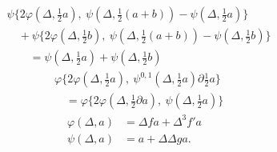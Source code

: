 \[
\begin{aligned}
&\psi\{2\varphi(\Delta,\tfrac12 a),\ \psi(\Delta,\tfrac12(a+b))-\psi(\Delta,\tfrac12 a)\}\\
&\quad+\psi\{2\varphi(\Delta,\tfrac12 b),\ \psi(\Delta,\tfrac12(a+b))-\psi(\Delta,\tfrac12 b)\}\\
&\qquad=\psi(\Delta,\tfrac12 a)+\psi(\Delta,\tfrac12 b)
\end{aligned}
\]
\[
\begin{aligned}
&\varphi\{2\varphi(\Delta,\tfrac12 a),\ \psi^{0,1}(\Delta,\tfrac12 a)\partial\tfrac12 a\}\\
&\quad=\varphi\{2\varphi(\Delta,\tfrac12\partial a),\ \psi(\Delta,\tfrac12 a)\}
\end{aligned}
\]
\[
\begin{aligned}
\varphi(\Delta,a)&=\Delta f a+\Delta^3 f'a\\
\psi(\Delta,a)&=a+\Delta\Delta g a.
\end{aligned}
\]
